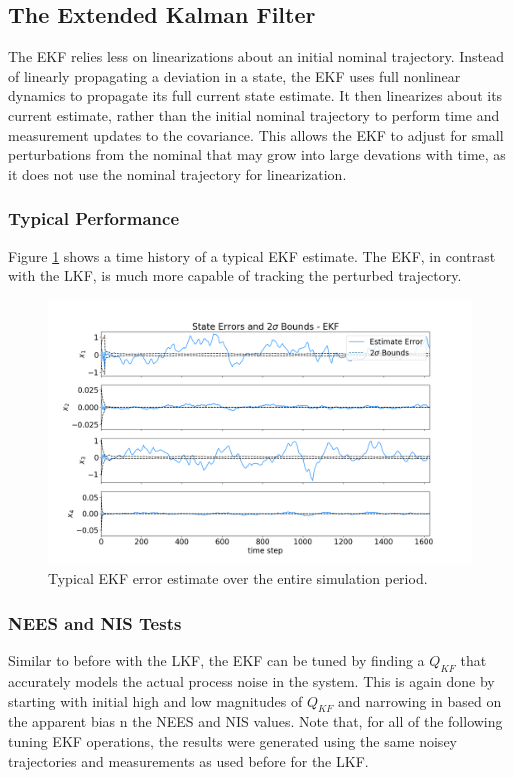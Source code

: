 \documentclass[11pt, a4paper]{article}
\begin{document}
\subsection{The Extended Kalman Filter}
\label{sec: EKF}
The EKF relies less on linearizations about an initial nominal trajectory.
Instead of linearly propagating a deviation in a state, the EKF uses full nonlinear dynamics to propagate its full current state estimate. 
It then linearizes about its current estimate, rather than the initial nominal trajectory to perform time and measurement updates to the covariance.   
This allows the EKF to adjust for small perturbations from the nominal that may grow into large devations with time, as it does not use the nominal trajectory for linearization. 

\subsubsection{Typical Performance}
Figure \ref{fig:ekf_est} shows a time history of a typical EKF estimate. 
The EKF, in contrast with the LKF, is much more capable of tracking the perturbed trajectory.  

\begin{figure}[H]
	\centering
	\includegraphics[width=\textwidth]{Figures/ekf_estimate_th.png}
	\caption{Typical EKF error estimate over the entire simulation period. }
	\label{fig:ekf_est}
\end{figure}


\subsubsection{NEES and NIS Tests}
Similar to before with the LKF, the EKF can be tuned by finding a $Q_{KF}$ that accurately models the actual process noise in the system. 
This is again done by starting with initial high and low magnitudes of $Q_{KF}$ and narrowing in based on the apparent bias n the NEES and NIS values. 
Note that, for all of the following tuning EKF operations, the results were generated using the same noisey trajectories and measurements as used before for the LKF. 
\end{document}
